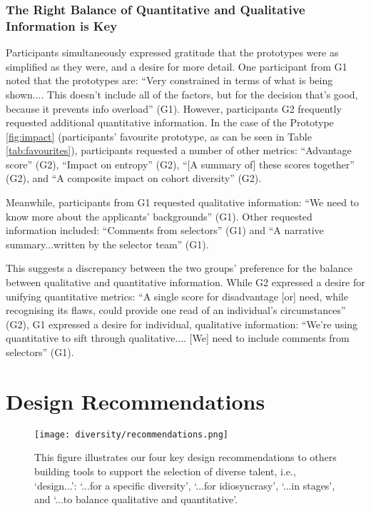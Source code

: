 \subsubsection{The Right Balance of Quantitative and Qualitative Information is Key}
Participants simultaneously expressed gratitude that the prototypes were as simplified as they were, and a desire for more detail. One participant from G1 noted that the prototypes are: ``Very constrained in terms of what is being shown.... This doesn't include all of the factors, but for the decision that's good, because it prevents info overload'' (G1). However, participants G2 frequently requested additional quantitative information. In the case of the Prototype \ref{fig:impact} (participants' favourite prototype, as can be seen in Table \ref{tab:favourites}), participants requested a number of other metrics: ``Advantage score'' (G2), ``Impact on entropy'' (G2), ``[A summary of] these scores together'' (G2), and ``A composite impact on cohort diversity'' (G2).

Meanwhile, participants from G1 requested qualitative information: ``We need to know more about the applicants' backgrounds'' (G1). Other requested information included: ``Comments from selectors'' (G1) and ``A narrative summary...written by the selector team'' (G1). 

This suggests a discrepancy between the two groups' preference for the balance between qualitative and quantitative information. While G2 expressed a desire for unifying quantitative metrics: ``A single score for disadvantage [or] need, while recognising its flaws, could provide one read of an individual's circumstances'' (G2), G1 expressed a desire for individual, qualitative information: ``We're using quantitative to sift through qualitative.... [We] need to include comments from selectors'' (G1).


\section{Design Recommendations}
\begin{figure}[htbp]
    \centering
    \texttt{[image: diversity/recommendations.png]}
    \caption{This figure illustrates our four key design recommendations to others building tools to support the selection of diverse talent, i.e., `design...': `...for a specific diversity', `...for idiosyncrasy', `...in stages', and `...to balance qualitative and quantitative'.}
    \label{fig:recommendations}
\end{figure}

